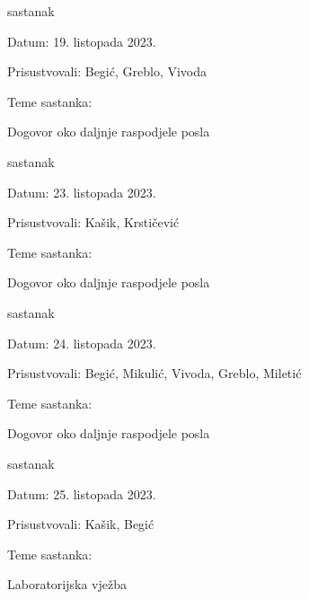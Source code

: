 \begin{packed_enum}
	\item  sastanak
	\item[] \begin{packed_item}
		\item Datum: 19. listopada 2023.
		\item Prisustvovali: Begić, Greblo, Vivoda 
		\item Teme sastanka:
		\begin{packed_item}
			\item  Dogovor oko daljnje raspodjele posla
		\end{packed_item}
	\end{packed_item}
	
	\item  sastanak
	\item[] \begin{packed_item}
		\item Datum: 23. listopada 2023.
		\item Prisustvovali: Kašik, Krstičević
		\item Teme sastanka:
		\begin{packed_item}
			\item  Dogovor oko daljnje raspodjele posla
		\end{packed_item}
	\end{packed_item}
	
	\item  sastanak
	\item[] \begin{packed_item}
		\item Datum: 24. listopada 2023.
		\item Prisustvovali: Begić, Mikulić, Vivoda, Greblo, Miletić
		\item Teme sastanka:
		\begin{packed_item}
			\item  Dogovor oko daljnje raspodjele posla
		\end{packed_item}
	\end{packed_item}
	
	\item  sastanak
	\item[] \begin{packed_item}
		\item Datum: 25. listopada 2023.
		\item Prisustvovali: Kašik, Begić 
		\item Teme sastanka:
		\begin{packed_item}
			\item  Laboratorijska vježba
		\end{packed_item}
	\end{packed_item}
	

\end{packed_enum}
